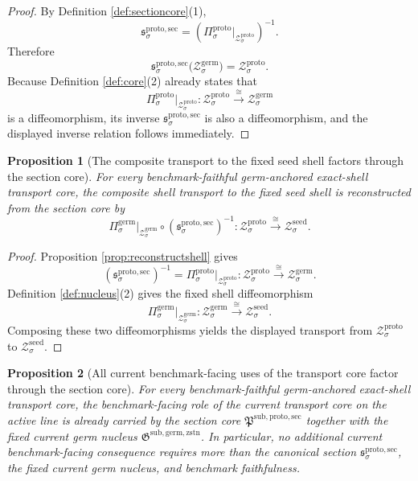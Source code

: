 \documentclass[11pt]{article}
\newcommand{\SeedShell}[1]{\mathcal Z_{#1}^{\mathrm{seed}}}
\newcommand{\GermNucleus}{\mathfrak G^{\mathrm{sub,germ,zstn}}}
\newcommand{\GermProj}[1]{\Pi_{#1}^{\mathrm{germ}}}
\newcommand{\GermShell}[1]{\mathcal Z_{#1}^{\mathrm{germ}}}
\newcommand{\ProtoSectionCore}{\mathfrak P^{\mathrm{sub,proto,sec}}}
\newcommand{\ProtoProj}[1]{\Pi_{#1}^{\mathrm{proto}}}
\newcommand{\ProtoShell}[1]{\mathcal Z_{#1}^{\mathrm{proto}}}
\newcommand{\ProtoTransportSec}[1]{\mathfrak s_{#1}^{\mathrm{proto,sec}}}
\newtheorem{proposition}{Proposition}
\begin{document}
\begin{proof}
By Definition \ref{def:sectioncore}(1),
\[
\ProtoTransportSec{\sigma}
=
\left(
\ProtoProj{\sigma}\big|_{\ProtoShell{\sigma}}
\right)^{-1}.
\]
Therefore
\[
\ProtoTransportSec{\sigma}\bigl(\GermShell{\sigma}\bigr)=\ProtoShell{\sigma}.
\]
Because Definition \ref{def:core}(2) already states that
\[
\ProtoProj{\sigma}\big|_{\ProtoShell{\sigma}}
:
\ProtoShell{\sigma}\xrightarrow{\cong}\GermShell{\sigma}
\]
is a diffeomorphism, its inverse \(\ProtoTransportSec{\sigma}\) is also a diffeomorphism, and the displayed inverse relation follows immediately.
\end{proof}

\begin{proposition}[The composite transport to the fixed seed shell factors through the section core]
\label{prop:seedtransport}
For every benchmark-faithful germ-anchored exact-shell transport core, the composite shell transport to the fixed seed shell is reconstructed from the section core by
\[
\GermProj{\sigma}\big|_{\GermShell{\sigma}}
\circ
\left(\ProtoTransportSec{\sigma}\right)^{-1}
:
\ProtoShell{\sigma}\xrightarrow{\cong}\SeedShell{\sigma}.
\]
\end{proposition}

\begin{proof}
Proposition \ref{prop:reconstructshell} gives
\[
\left(\ProtoTransportSec{\sigma}\right)^{-1}
=
\ProtoProj{\sigma}\big|_{\ProtoShell{\sigma}}
:
\ProtoShell{\sigma}\xrightarrow{\cong}\GermShell{\sigma}.
\]
Definition \ref{def:nucleus}(2) gives the fixed shell diffeomorphism
\[
\GermProj{\sigma}\big|_{\GermShell{\sigma}}
:
\GermShell{\sigma}\xrightarrow{\cong}\SeedShell{\sigma}.
\]
Composing these two diffeomorphisms yields the displayed transport from \(\ProtoShell{\sigma}\) to \(\SeedShell{\sigma}\).
\end{proof}

\begin{proposition}[All current benchmark-facing uses of the transport core factor through the section core]
\label{prop:downstream}
For every benchmark-faithful germ-anchored exact-shell transport core, the benchmark-facing role of the current transport core on the active line is already carried by the section core \(\ProtoSectionCore\) together with the fixed current germ nucleus \(\GermNucleus\). In particular, no additional current benchmark-facing consequence requires more than the canonical section \(\ProtoTransportSec{\sigma}\), the fixed current germ nucleus, and benchmark faithfulness.
\end{proposition}
\end{document}

